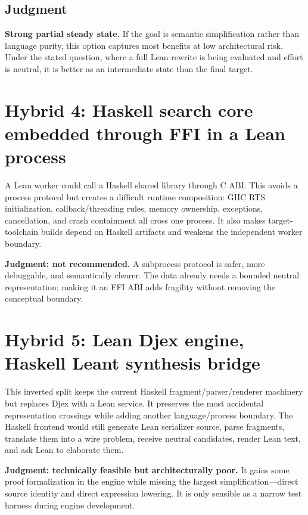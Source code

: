 \documentclass[10pt,letterpaper,oneside]{report}
\begin{document}
\subsection{Judgment}

\textbf{Strong partial steady state.} If the goal is semantic simplification rather than language purity, this option captures most benefits at low architectural risk. Under the stated question, where a full Lean rewrite is being evaluated and effort is neutral, it is better as an intermediate state than the final target.

\section{Hybrid 4: Haskell search core embedded through FFI in a Lean process}

A Lean worker could call a Haskell shared library through C ABI. This avoids a process protocol but creates a difficult runtime composition: GHC RTS initialization, callback/threading rules, memory ownership, exceptions, cancellation, and crash containment all cross one process. It also makes target-toolchain builds depend on Haskell artifacts and weakens the independent worker boundary.

\textbf{Judgment: not recommended.} A subprocess protocol is safer, more debuggable, and semantically clearer. The data already needs a bounded neutral representation; making it an FFI ABI adds fragility without removing the conceptual boundary.

\section{Hybrid 5: Lean Djex engine, Haskell Leant synthesis bridge}

This inverted split keeps the current Haskell fragment/parser/renderer machinery but replaces Djex with a Lean service. It preserves the most accidental representation crossings while adding another language/process boundary. The Haskell frontend would still generate Lean serializer source, parse fragments, translate them into a wire problem, receive neutral candidates, render Lean text, and ask Lean to elaborate them.

\textbf{Judgment: technically feasible but architecturally poor.} It gains some proof formalization in the engine while missing the largest simplification---direct source identity and direct expression lowering. It is only sensible as a narrow test harness during engine development.
\end{document}
